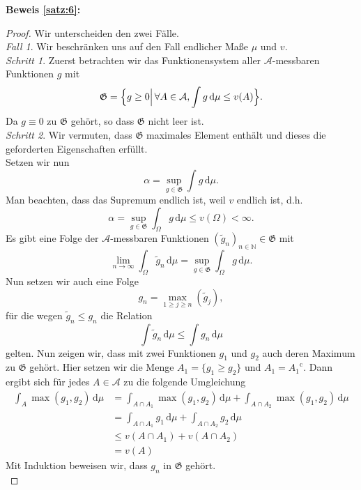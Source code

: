 \documentclass[/Users/zhangwusheng/Documents/satz von radon nikodym/satz von radon nikodym.tex]{subfiles}
\begin{document}
    \textbf{Beweis \cref{satz:6}:}
    \begin{proof}
        Wir unterscheiden den zwei Fälle.\\
        \textit{Fall 1}. Wir beschränken uns auf den Fall endlicher Maße $\mu$ und $v$.\\
        \textit{Schritt 1}. Zuerst betrachten wir 
        das Funktionensystem aller $\mathcal{A}$-messbaren Funktionen $g$ mit 
        \[\mathfrak{G} = \Bigl\{g \geq 0 \Bigl|\, \forall A \in \mathcal{A}, \int g\,\mathrm{d}\mu \leq v(A)\Bigr\}.\]
        Da $g \equiv 0$ zu $\mathfrak{G}$ gehört, so dass $\mathfrak{G}$ nicht leer ist.\\
        \textit{Schritt 2}. Wir vermuten, dass $\mathfrak{G}$ maximales Element enthält und dieses die geforderten Eigenschaften erfüllt.\\
        Setzen wir nun
        \[\alpha = \sup_{g \in \mathfrak{G}} \int g\,\mathrm{d}\mu.\]
        Man beachten, dass das Supremum endlich ist, weil $v$ endlich ist, d.h. 
        \[\alpha = \sup_{g \in \mathfrak{G}} \int_{\Omega} g\,\mathrm{d}\mu \leq v(\Omega) < \infty.\]
        Es gibt eine Folge der $\mathcal{A}$-messbaren Funktionen $(\tilde{g}_n)_{n \in \mathbb{N}} \in \mathfrak{G}$ mit 
        \[\lim_{n \to \infty} \int_{\Omega} \tilde{g}_n\,\mathrm{d}\mu = \sup_{g \in \mathfrak{G}} \int_{\Omega} g\,\mathrm{d}\mu.\]
        Nun setzen wir auch eine Folge 
        \[g_n = \max_{1 \geq j \geq n}{(\tilde{g}_j)},\]
        für die wegen $\tilde{g}_n \leq g_n$ die Relation 
        \[\int \tilde{g}_n\,\mathrm{d}\mu \leq \int g_n\,\mathrm{d}\mu\]
        gelten. 
        Nun zeigen wir, dass mit zwei Funktionen $g_1$ und $g_2$ auch deren Maximum zu $\mathfrak{G}$ gehört. Hier setzen wir die Menge $A_1 = \{g_1 \geq g_2\}$ und 
        $A_1 = {A_1}^{\mathrm{c}}$. Dann ergibt sich für jedes $A \in \mathcal{A}$ zu die folgende Umgleichung 
        \begin{align*} 
            \int_A \max{(g_1, g_2)}\,\mathrm{d}\mu &= \int_{A \cap A_1} \max{(g_1, g_2)}\,\mathrm{d}\mu + \int_{A \cap A_2} \max{(g_1, g_2)}\,\mathrm{d}\mu\\
            &= \int_{A \cap A_1} g_1\,\mathrm{d}\mu + \int_{A \cap A_2} g_2\,\mathrm{d}\mu\\
            &\leq v(A \cap A_1) + v(A \cap A_2)\\
            &=v(A)
        \end{align*}
        Mit Induktion beweisen wir, dass $g_n$ in $\mathfrak{G}$ gehört.\\

\end{proof}
\end{document}
